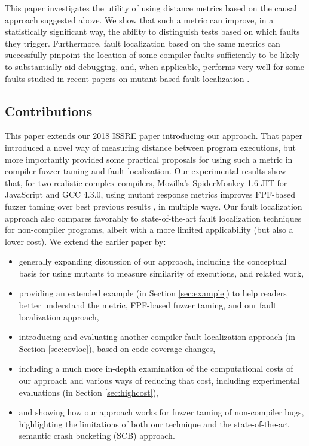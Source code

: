 This paper investigates the utility of using distance metrics based on the causal approach suggested above.  We show that such a metric can improve, in a statistically significant way, the ability to distinguish tests based on which faults they trigger.  Furthermore, fault localization based on the same metrics can successfully pinpoint the location of some compiler faults sufficiently to be likely to substantially aid debugging, and, when applicable, performs very well for some faults studied in recent papers on mutant-based fault localization \cite{multilingual,Papadakis}.

\subsection{Contributions}

This paper extends our 2018 ISSRE paper \cite{ISSRE18Mutants} introducing our approach. That paper introduced a novel way of measuring distance between program executions, but more importantly provided some practical proposals for using such a metric in compiler fuzzer taming and fault localization.  Our experimental results show that, for two realistic complex compilers, Mozilla's SpiderMonkey 1.6 JIT for JavaScript and GCC 4.3.0, using mutant response metrics improves FPF-based fuzzer taming over best previous results \cite{PLDI13}, in multiple ways.  Our fault localization approach also compares favorably to state-of-the-art fault localization techniques \cite{MUSE,multilingual,Metallaxis} for non-compiler programs, albeit with a more limited applicability (but also a lower cost).  We extend the earlier paper by:

\begin{itemize}
\item generally expanding discussion of our approach, including the conceptual basis for using mutants to measure similarity of executions, and related work,
\item providing an extended example (in Section \ref{sec:example}) to help readers better understand the metric, FPF-based fuzzer taming, and our fault localization approach,
\item introducing and evaluating another compiler fault localization approach (in Section \ref{sec:covloc}), based on code coverage changes,
\item including a much more in-depth examination of the computational costs of our approach and various ways of reducing that cost, including experimental evaluations (in Section \ref{sec:highcost}),
\item and showing how our approach works for fuzzer taming of non-compiler bugs, highlighting the limitations of both our technique and the state-of-the-art semantic crash bucketing (SCB) \cite{SCB} approach.
\end{itemize}